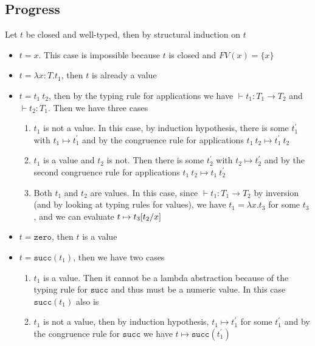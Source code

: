 \documentclass{article}
\newcommand{\subst}[3]{\ensuremath #1[#2/#3]}
\begin{document}
\subsection*{Progress}
Let $t$ be closed and well-typed, then by structural induction on $t$
\begin{itemize}
\item $t=x$. This case is impossible because $t$ is closed and $FV(x) = \{x\}$
\item $t=\lambda x:T.t_1$, then $t$ is already a value
\item $t = t_1\ t_2$, then by the typing rule for applications we have $\vdash t_1:T_1 \rightarrow T_2$ and $\vdash t_2:T_1$. Then we have three cases 
\begin{enumerate}
\item $t_1$ is not a value. 
In this case, by induction hypothesis, there is some $t_1^{\prime}$ with $t_1\mapsto t_1^{\prime}$ and 
by the congruence rule for applications $t_1\ t_2 \mapsto t_1^{\prime}\ t_2$
\item $t_1$ is a value and $t_2$ is not. 
Then there is some $t_2^{\prime}$ with $t_2\mapsto t_2^{\prime}$ and by the second congruence rule for applications $t_1\ t_2\mapsto t_1\ t_2^{\prime}$
\item Both $t_1$ and $t_2$ are values. 
In this case, since $\vdash t_1:T_1\rightarrow T_2$ by inversion (and by looking at typing rules for values), we have $t_1=\lambda x.t_3$ for some $t_3$, and we can evaluate $t \mapsto \subst{t_3}{t_2}{x}$
\end{enumerate}
\item $t = \mathtt{zero}$, then $t$ is a value 
\item $t = \mathtt{succ}(t_1)$, then we have two cases 
\begin{enumerate}
\item $t_1$ is a value. Then it cannot be a lambda abstraction because of the typing rule for $\mathtt{succ}$ and thus must be a numeric value.
In this case $\mathtt{succ}(t_1)$ also is
\item $t_1$ is not a value, then by induction hypothesis, $t_1\mapsto t_1^{\prime}$ for some $t_1^{\prime}$ and by the congruence rule for $\mathtt{succ}$ we have $t\mapsto \mathtt{succ}(t_1^{\prime})$
\end{enumerate}
\end{itemize}
\end{document}
